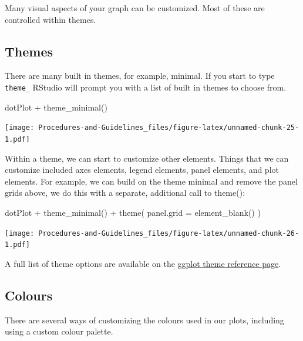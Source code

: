\documentclass[
]{book}
\newenvironment{Shaded}{\begin{snugshade}}{\end{snugshade}}
\newcommand{\AttributeTok}[1]{\textcolor[rgb]{0.77,0.63,0.00}{#1}}
\newcommand{\FunctionTok}[1]{\textcolor[rgb]{0.00,0.00,0.00}{#1}}
\newcommand{\NormalTok}[1]{#1}
\newcommand{\SpecialCharTok}[1]{\textcolor[rgb]{0.00,0.00,0.00}{#1}}
\begin{document}
Many visual aspects of your graph can be customized. Most of these are controlled within themes.

\hypertarget{themes}{%
\subsection*{Themes}\label{themes}}

There are many built in themes, for example, minimal. If you start to type \texttt{theme\_} RStudio will prompt you with a list of built in themes to choose from.

\begin{Shaded}
\begin{Highlighting}[]
\NormalTok{dotPlot }\SpecialCharTok{+}
  \FunctionTok{theme\_minimal}\NormalTok{()}
\end{Highlighting}
\end{Shaded}

\texttt{[image: Procedures-and-Guidelines\_files/figure-latex/unnamed-chunk-25-1.pdf]}

Within a theme, we can start to customize other elements. Things that we can customize included axes elements, legend elements, panel elements, and plot elements. For example, we can build on the theme minimal and remove the panel grids above, we do this with a separate, additional call to theme():

\begin{Shaded}
\begin{Highlighting}[]
\NormalTok{dotPlot }\SpecialCharTok{+}
  \FunctionTok{theme\_minimal}\NormalTok{() }\SpecialCharTok{+}
  \FunctionTok{theme}\NormalTok{(}
    \AttributeTok{panel.grid =} \FunctionTok{element\_blank}\NormalTok{()}
\NormalTok{  )}
\end{Highlighting}
\end{Shaded}

\texttt{[image: Procedures-and-Guidelines\_files/figure-latex/unnamed-chunk-26-1.pdf]}

A full list of theme options are available on the \href{https://ggplot2.tidyverse.org/reference/theme.html}{ggplot theme reference page}.

\hypertarget{colours}{%
\subsection*{Colours}\label{colours}}

There are several ways of customizing the colours used in our plots, including using a custom colour palette.
\end{document}
